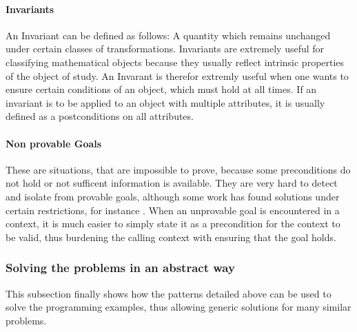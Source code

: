 \paragraph{Invariants} \label{invariants}
An Invariant can be defined as follows: A quantity which remains unchanged under certain classes of transformations. Invariants are extremely useful for classifying mathematical objects because they usually reflect intrinsic properties of the object of study.\cite[282ff]{hunt}
\newline An Invarant is therefor extremly useful when one wants to ensure certain conditions of an object, which must hold at all times. If an invariant is to be applied to an object with multiple attributes, it is usually defined as a postconditions on all attributes. 

\paragraph{Non provable Goals} \label{non provable goal}
These are situations, that are impossible to prove, because some preconditions do not hold or not sufficent information is available. They are very hard to detect and isolate from provable goals, although some work has found solutions under certain restrictions, for instance \cite{goals}. When an unprovable goal is encountered in a context, it is much easier to simply state it as a precondition for the context to be valid, thus burdening the calling context with ensuring that the goal holds. 

\subsubsection{Solving the problems in an abstract way}
This subsection finally shows how the patterns detailed above can be used to solve the programming examples, thus allowing generic solutions for many similar problems.

